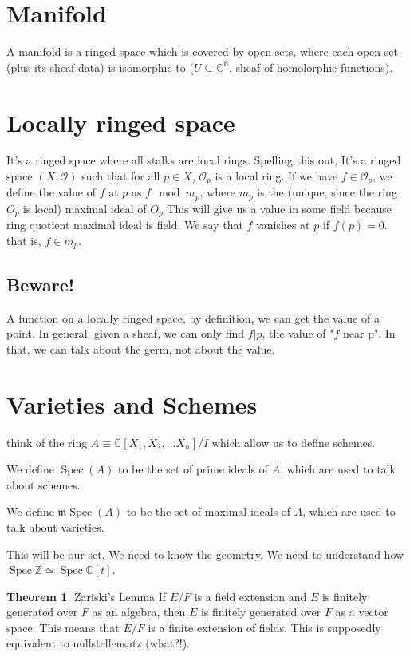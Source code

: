 \documentclass{book}
\newcommand{\Z}{\ensuremath{\mathbb{Z}}}
\newcommand{\C}{\ensuremath{\mathbb{C}}}
\renewcommand{\O}{\ensuremath{\mathcal{O}}}
\newcommand{\Spec}{\operatorname{Spec}}
\newcommand{\m}{\mathfrak{m}}
\theoremstyle{definition}
\newtheorem{theorem}{Theorem}
\begin{document}
\section{Manifold}
A manifold is a ringed space which is covered by open sets, where each open
set (plus its sheaf data) is isomorphic to ($U \subseteq \mathbb{C^n}$, sheaf of homolorphic functions).


\section{Locally ringed space}
It's a ringed space where all stalks are local rings. Spelling this out,
It's a ringed space $(X, \O)$ such that for all $p \in X$, $\O_p$ is a local
ring. If we have $f \in \O_p$, we define the value of $f$ at $p$ as $f \mod m_p$,
where $m_p$ is the (unique, since the ring $O_p$ is local) maximal ideal of $O_p$
This will give us a value in some field because ring quotient maximal ideal is 
field. We say that $f$ vanishes at $p$ if $f(p) = 0$. that is, $f \in m_p$. 

\subsection{Beware!}
A function on a locally ringed space, by definition, we can get the value of a 
point. In general, given a sheaf, we can only find $f|p$, the value of "$f$ near p".
In that, we can talk about the germ, not about the value.

\section{Varieties and Schemes}
think of the ring $A \equiv \C[X_1, X_2, \dots X_n] / I$ which allow us to
define schemes. 

We define $\Spec(A)$ to be the set of prime ideals of $A$, which
are used to talk about schemes. 

We define $\m\Spec(A)$ to be the set of maximal
ideals of $A$, which are used to talk about varieties.

This will be our set. We need to know the geometry. We need to understand
how $\Spec \Z \simeq \Spec \C[t]$.


\begin{theorem}
    Zariski's Lemma If $E/F$ is a field extension and $E$ is finitely generated
    over $F$ as an algebra, then $E$ is finitely generated over $F$ as a vector space.
    This means that $E/F$ is a finite extension of fields.
    This is supposedly equivalent to nullstellensatz (what?!).
\end{theorem}
\end{document}
